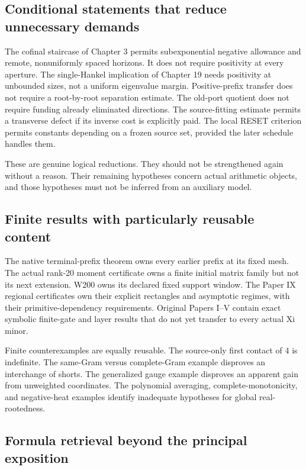 \documentclass[
  10pt,
  a4paper,
  10pt,
  oneside,
  openany]{book}
\begin{document}
\subsection{Conditional statements that reduce unnecessary
demands}\label{conditional-statements-that-reduce-unnecessary-demands}

The cofinal staircase of Chapter 3 permits subexponential negative
allowance and remote, nonuniformly spaced horizons. It does not require
positivity at every aperture. The single-Hankel implication of Chapter
19 needs positivity at unbounded sizes, not a uniform eigenvalue margin.
Positive-prefix transfer does not require a root-by-root separation
estimate. The old-port quotient does not require funding already
eliminated directions. The source-fitting estimate permits a transverse
defect if its inverse cost is explicitly paid. The local RESET criterion
permits constants depending on a frozen source set, provided the later
schedule handles them.

These are genuine logical reductions. They should not be strengthened
again without a reason. Their remaining hypotheses concern actual
arithmetic objects, and those hypotheses must not be inferred from an
auxiliary model.

\subsection{Finite results with particularly reusable
content}\label{finite-results-with-particularly-reusable-content}

The native terminal-prefix theorem owns every earlier prefix at its
fixed mesh. The actual rank-20 moment certificate owns a finite initial
matrix family but not its next extension. W200 owns its declared fixed
support window. The Paper IX regional certificates own their explicit
rectangles and asymptotic regimes, with their primitive-dependency
requirements. Original Papers I--V contain exact symbolic finite-gate
and layer results that do not yet transfer to every actual Xi minor.

Finite counterexamples are equally reusable. The source-only first
contact of 4 is indefinite. The same-Gram versus complete-Gram example
disproves an interchange of shorts. The generalized gauge example
disproves an apparent gain from unweighted coordinates. The polynomial
averaging, complete-monotonicity, and negative-heat examples identify
inadequate hypotheses for global real-rootedness.

\subsection{Formula retrieval beyond the principal
exposition}\label{formula-retrieval-beyond-the-principal-exposition}
\end{document}
